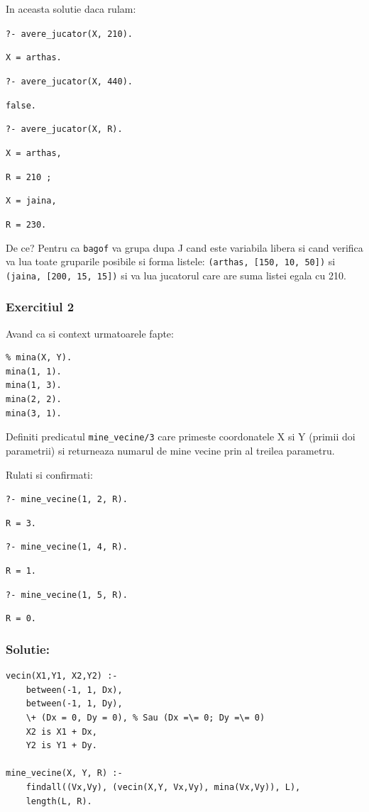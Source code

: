 In aceasta solutie daca rulam:

\texttt{?- avere\_jucator(X, 210).}

\texttt{X = arthas.}

\texttt{?- avere\_jucator(X, 440).}

\texttt{false.}

\texttt{?- avere\_jucator(X, R).}

\texttt{X = arthas,}

\texttt{R = 210 ;}

\texttt{X = jaina,}

\texttt{R = 230.}

\newpage

De ce? Pentru ca \texttt{bagof} va grupa dupa J cand este variabila libera si
cand verifica va lua toate gruparile posibile si forma listele:
\texttt{(arthas, [150, 10, 50])} si \texttt{(jaina, [200, 15, 15])} si va lua jucatorul
care are suma listei egala cu 210.


\subsubsection*{Exercitiul 2}

Avand ca si context urmatoarele fapte:
\begin{lstlisting}
% mina(X, Y).
mina(1, 1).
mina(1, 3).
mina(2, 2).
mina(3, 1).
\end{lstlisting}

Definiti predicatul \texttt{mine\_vecine/3} care primeste coordonatele X si Y (primii doi parametrii) si returneaza numarul de mine vecine prin al treilea parametru.

Rulati si confirmati:

\texttt{?- mine\_vecine(1, 2, R).}

\texttt{R = 3.}

\texttt{?- mine\_vecine(1, 4, R).}

\texttt{R = 1.}

\texttt{?- mine\_vecine(1, 5, R).}

\texttt{R = 0.}


\subsubsection*{Solutie:}

\begin{lstlisting}
vecin(X1,Y1, X2,Y2) :-
    between(-1, 1, Dx),
    between(-1, 1, Dy),
    \+ (Dx = 0, Dy = 0), % Sau (Dx =\= 0; Dy =\= 0)
    X2 is X1 + Dx,
    Y2 is Y1 + Dy.

mine_vecine(X, Y, R) :-
    findall((Vx,Vy), (vecin(X,Y, Vx,Vy), mina(Vx,Vy)), L),
    length(L, R).
\end{lstlisting}


